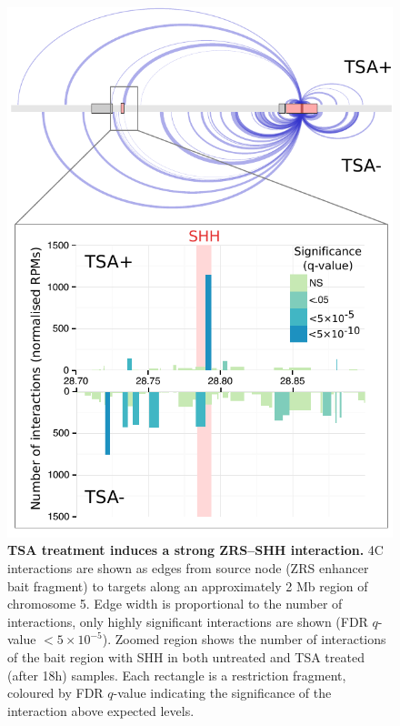 \documentclass[a4paper,11pt,oneside]{book}
\begin{document}
\begin{figure}
\begin{center} 
\includegraphics[width=5in]{figs/shharc_full.pdf}
\captionsetup{width=\textwidth} 
\caption[TSA treatment induces a strong ZRS--SHH interaction. ]{ {\bf TSA treatment induces a strong ZRS--SHH interaction. }
4C interactions are shown as edges from source node (ZRS enhancer bait fragment) to targets along an approximately 2 Mb region of chromosome 5. Edge width is proportional to the number of interactions, only highly significant interactions are shown (FDR $q$-value $<5 \times 10 ^{-5}$). Zoomed region shows the number of interactions of the bait region with SHH in both untreated and TSA treated (after 18h) samples. Each rectangle is a restriction fragment, coloured by FDR $q$-value indicating the significance of the interaction above expected levels.
}\label{fig:ssharc}
\end{center} 
\end{figure} 
\end{document}
